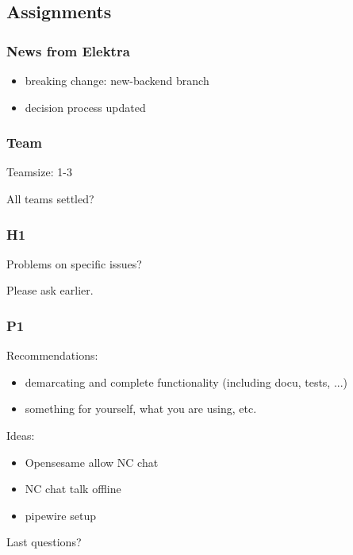 \breakframe



\breakframe

\subsection{Assignments}

\begin{frame}
	\frametitle{News from Elektra}

	\begin{itemize}
	\item breaking change: new-backend branch
	\item decision process updated
	\end{itemize}
\end{frame}

\begin{assignment}
	\frametitle{Team}
	Teamsize: 1-3

	\begin{task}
	All teams settled?
	\end{task}
\end{assignment}

\begin{assignment}
	\frametitle{H1}
	\begin{task}
	Problems on specific issues?
	\end{task}

	\pause

	Please ask earlier.
\end{assignment}

\begin{assignment}
	\frametitle{P1}

	Recommendations:

	\begin{itemize}
	\item demarcating and complete functionality (including docu, tests, ...)
	\item something for yourself, what you are using, etc.
	\end{itemize}

	Ideas:

	\begin{itemize}
	\item Opensesame allow NC chat
	\item NC chat talk offline
	\item pipewire setup
	\end{itemize}

	\begin{task}
	Last questions?
	\end{task}
\end{assignment}

